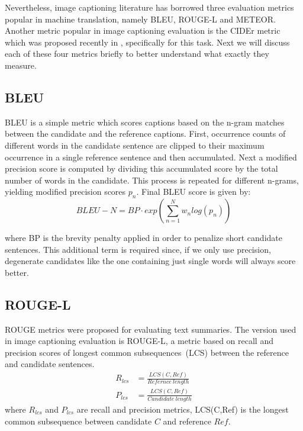 Nevertheless, image captioning literature has borrowed three evaluation metrics
popular in machine translation, namely BLEU\cite{Papineni:BLEU},
ROUGE-L\cite{lin2004rouge} and METEOR\cite{denkowski-lavie:2014:Meteor}. 
Another metric popular in image captioning evaluation is the CIDEr metric which
was proposed recently in \cite{Vedantam_2015_CVPR}, specifically for this task. 
Next we will discuss each of these four metrics briefly to better understand
what exactly they measure.

\subsection{BLEU}

BLEU is a simple metric which scores captions based on the n-gram matches
between the candidate and the reference captions.
First, occurrence counts of different words in the candidate sentence are
clipped to their maximum occurrence in a single reference sentence and
then accumulated.
Next a modified precision score is computed by dividing this accumulated score
by the total number of words in the candidate.
This process is repeated for different n-grams, yielding modified precision
scores $p_n$. 
Final BLEU score is given by:
\begin{equation}
    BLEU-N = BP\cdot{}exp(\sum_{n=1}^{N}w_{n}log(p_n))        
\end{equation}

\noindent where BP is the brevity penalty applied in order to penalize 
short candidate sentences.
This additional term is required since, if we only use precision, degenerate
candidates like the one containing just single words will always score better.
\subsection{ROUGE-L}
ROUGE metrics were proposed for evaluating text summaries.
The version used in image captioning evaluation is ROUGE-L, a metric based on
recall and precision scores of longest common subsequences~(LCS) between the reference
and candidate sentences.
\begin{align}
        R_{lcs} &= \frac{LCS(C,Ref)}{Refernce\ length}\\[0.75ex]
        P_{lcs} &= \frac{LCS(C,Ref)}{Candidate\ length}
\end{align}
\noindent where $R_{lcs}$ and $P_{lcs}$ are recall and precision metrics,
LCS(C,Ref) is the longest common subsequence between candidate $C$ and reference
$Ref$. 

